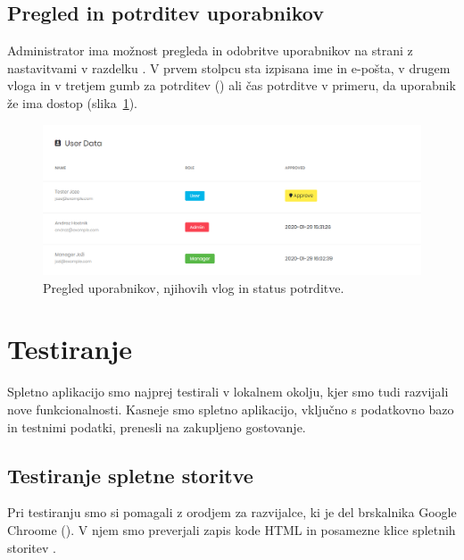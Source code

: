 \documentclass[a4paper, 12pt]{book}
\begin{document}
\clearpage


\section{Pregled in potrditev uporabnikov}

Administrator ima možnost pregleda in odobritve uporabnikov na strani z nastavitvami v razdelku . V prvem stolpcu sta izpisana ime in e-pošta, v drugem vloga in v tretjem gumb za potrditev () ali čas potrditve v primeru, da uporabnik že ima dostop (slika~\ref{ss-settings-users}).

\begin{figure}[h]
\begin{center}
\includegraphics[width=\textwidth]{slike/users.png}
\end{center}
\caption{Pregled uporabnikov, njihovih vlog in status potrditve.}
\label{ss-settings-users}
\end{figure}



\chapter{Testiranje}
\label{testiranje}

Spletno aplikacijo smo najprej testirali v lokalnem okolju, kjer smo tudi razvijali nove funkcionalnosti. Kasneje smo spletno aplikacijo, vključno s podatkovno bazo in testnimi podatki, prenesli na zakupljeno gostovanje.

\section{Testiranje spletne storitve}

Pri testiranju smo si pomagali z orodjem za razvijalce, ki je del brskalnika Google Chroome (). V njem smo preverjali zapis kode HTML in posamezne klice spletnih storitev \cite{google-devtools}.
\end{document}
